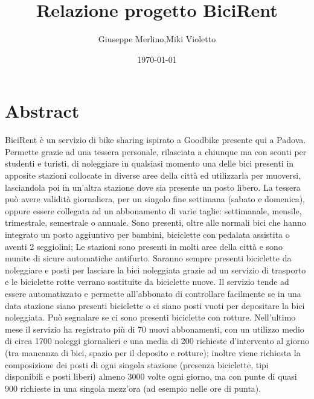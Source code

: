 \documentclass[a4paper,twoside]{article}
\author{Giuseppe Merlino,Miki Violetto}
\title{Relazione progetto BiciRent}
\date{\today}
\begin{document}
\maketitle

\newpage
\tableofcontents
\newpage


\section{Abstract}
BiciRent è un servizio di bike sharing ispirato a Goodbike presente qui a Padova.\newline
Permette grazie ad una tessera personale, rilasciata a chiunque ma con sconti per studenti e turisti, di noleggiare in qualsiasi momento una delle bici presenti in apposite stazioni collocate in diverse aree della città ed utilizzarla per muoversi, lasciandola poi in un'altra stazione dove sia presente un posto libero.\newline
La tessera può avere validità giornaliera, per un singolo fine settimana (sabato e domenica), oppure essere collegata ad un abbonamento di varie taglie: settimanale, mensile, trimestrale, semestrale o  annuale.\newline
Sono presenti, oltre alle normali bici che hanno integrato un posto aggiuntivo per bambini, biciclette con pedalata assistita o aventi 2 seggiolini;\newline
Le stazioni sono presenti in molti aree della città e sono munite di sicure automatiche antifurto. Saranno sempre presenti biciclette da noleggiare e posti per lasciare la bici noleggiata grazie ad un servizio di trasporto e le biciclette rotte verrano sostituite da biciclette nuove.\newline
Il servizio tende ad essere automatizzato e permette all'abbonato di controllare facilmente se in una data stazione siano presenti biciclette o ci siano posti vuoti per depositare la bici noleggiata. Può segnalare se ci sono presenti biciclette con rotture.\newline
Nell'ultimo mese il servizio ha registrato più di 70 nuovi abbonamenti, con un utilizzo medio di circa 1700 noleggi giornalieri e una media di 200 richieste d'intervento al giorno (tra mancanza di bici, spazio per il deposito e rotture);\newline
inoltre viene richiesta la composizione dei posti di ogni singola stazione (presenza biciclette, tipi disponibili e posti liberi) almeno 3000 volte ogni giorno, ma con punte di quasi 900 richieste in una singola mezz'ora (ad esempio nelle ore di punta).
\end{document}
